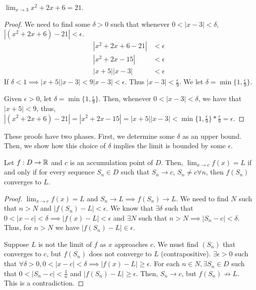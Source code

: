 \begin{theorem}{}{}
    $\lim_{x \to 3} x^2 + 2x + 6 = 21$.
\end{theorem}
\begin{proof}
    We need to find some $\delta > 0$ such that whenever $0 < |x - 3| < \delta$, $|(x^2 + 2x + 6) - 21| < \epsilon$.
    \begin{align*}
        |x^2 + 2x + 6 - 21| &< \epsilon \\
        |x^2 + 2x - 15| &< \epsilon \\
        |x + 5||x - 3| &< \epsilon
    \end{align*}
    If $\delta < 1 \implies |x + 5||x - 3| < 9|x - 3| < \epsilon$. Thus $|x - 3| < \frac{\epsilon}{9}$. We let $\delta = \min\{1, \frac{\epsilon}{9}\}$.

    Given $\epsilon > 0$, let $\delta = \min\{1, \frac{\epsilon}{9}\}$. Then, whenever $0 < |x - 3| < \delta$, we have that $|x + 5| < 9$, thus, $|(x^2 + 2x + 6) - 21| = |x^2 + 2x - 15| = |x + 5||x - 3| < \min\{1, \frac{\epsilon}{9}\} * \frac{\epsilon}{9} = \epsilon$.
\end{proof}
\begin{note}
    These proofs have two phases. First, we determine some $\delta$ as an upper bound. Then, we show how this choice of $\delta$ implies the limit is bounded by some $\epsilon$.
\end{note}

\begin{theorem}{}{}
    Let $f:D \to \mathbb{R}$ and $c$ is an accumulation point of $D$. Then, $\lim_{x \to c} f(x) = L$ if and only if for every sequence $S_n \in D$ such that $S_n \to c$, $S_n \neq c \forall n$, then $f(S_n)$ converges to $L$.
\end{theorem}
\begin{proof}
    $\lim_{x \to c} f(x) = L$ and $S_n \to L \implies f(S_n) \to L$. We need to find $N$ such that $n > N$ and $|f(S_n) - L| < \epsilon$. We know that $\exists \delta$ such that $0 < |x - c| < \delta \implies |f(x) - L| < \epsilon$ and $\exists N$ such that $n > N \implies |S_n - c| < \delta$. Thus, for $n > N$ we have $|f(S_n) - L| \in \epsilon$.

    Suppose $L$ is not the limit of $f$ as $x$ approaches $c$. We must find $(S_n)$ that converges to $c$, but $f(S_n)$ does not converge to $L$ (contrapositive). $\exists \epsilon > 0$ such that $\forall \delta > 0, 0 < |x - c| < \delta \implies |f(x) - L| \geq \epsilon$. For each $n \in N, \exists S_n \in D$ such that $0 < |S_n - c| < \frac{1}{n}$ and $|f(S_n) - L| \geq \epsilon$. Then, $S_n \to c$, but $f(S_n) \not\to L$. This is a contradiction.
\end{proof}